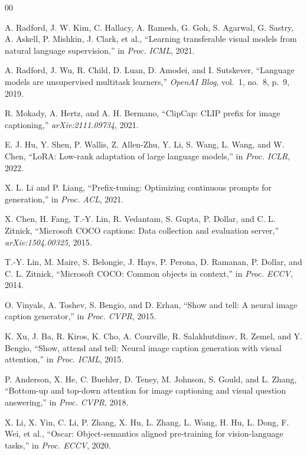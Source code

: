 \documentclass[conference]{IEEEtran}
\begin{document}
\begin{thebibliography}{00}

A. Radford, J. W. Kim, C. Hallacy, A. Ramesh, G. Goh, S. Agarwal, G. Sastry, A. Askell, P. Mishkin, J. Clark, et al., ``Learning transferable visual models from natural language supervision,'' in \textit{Proc. ICML}, 2021.

A. Radford, J. Wu, R. Child, D. Luan, D. Amodei, and I. Sutskever, ``Language models are unsupervised multitask learners,'' \textit{OpenAI Blog}, vol.~1, no.~8, p.~9, 2019.

R. Mokady, A. Hertz, and A. H. Bermano, ``ClipCap: CLIP prefix for image captioning,'' \textit{arXiv:2111.09734}, 2021.

E. J. Hu, Y. Shen, P. Wallis, Z. Allen-Zhu, Y. Li, S. Wang, L. Wang, and W. Chen, ``LoRA: Low-rank adaptation of large language models,'' in \textit{Proc. ICLR}, 2022.

X. L. Li and P. Liang, ``Prefix-tuning: Optimizing continuous prompts for generation,'' in \textit{Proc. ACL}, 2021.

X. Chen, H. Fang, T.-Y. Lin, R. Vedantam, S. Gupta, P. Dollar, and C. L. Zitnick, ``Microsoft COCO captions: Data collection and evaluation server,'' \textit{arXiv:1504.00325}, 2015.

T.-Y. Lin, M. Maire, S. Belongie, J. Hays, P. Perona, D. Ramanan, P. Dollar, and C. L. Zitnick, ``Microsoft COCO: Common objects in context,'' in \textit{Proc. ECCV}, 2014.

O. Vinyals, A. Toshev, S. Bengio, and D. Erhan, ``Show and tell: A neural image caption generator,'' in \textit{Proc. CVPR}, 2015.

K. Xu, J. Ba, R. Kiros, K. Cho, A. Courville, R. Salakhutdinov, R. Zemel, and Y. Bengio, ``Show, attend and tell: Neural image caption generation with visual attention,'' in \textit{Proc. ICML}, 2015.

P. Anderson, X. He, C. Buehler, D. Teney, M. Johnson, S. Gould, and L. Zhang, ``Bottom-up and top-down attention for image captioning and visual question answering,'' in \textit{Proc. CVPR}, 2018.

X. Li, X. Yin, C. Li, P. Zhang, X. Hu, L. Zhang, L. Wang, H. Hu, L. Dong, F. Wei, et al., ``Oscar: Object-semantics aligned pre-training for vision-language tasks,'' in \textit{Proc. ECCV}, 2020.


\end{thebibliography}
\end{document}
